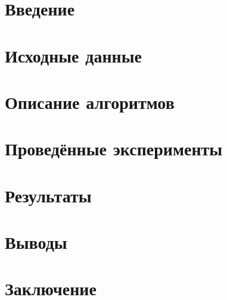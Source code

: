 \documentclass[a4paper,12pt]{article}
\begin{document}


\tableofcontents
\newpage

\section{ Введение }

\section{ Исходные данные }

\section{ Описание алгоритмов }

\section{ Проведённые эксперименты }

\section{ Результаты }

\section{ Выводы }

\section{ Заключение }


\newpage
{}
\printbibliography[title={Список использованных источников}]

% 
\end{document}

